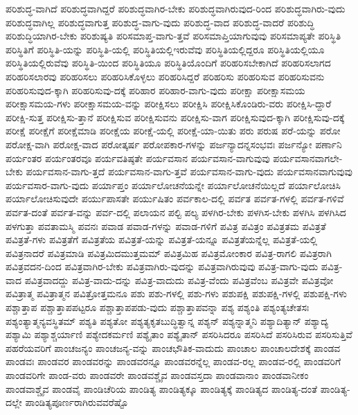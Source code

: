 {ಪರಿಶುದ್ಧ-ವಾಗಿದೆ
ಪರಿಶುದ್ಧವಾಗಿದ್ದರೆ
ಪರಿಶುದ್ಧವಾಗಿರ-ಬೇಕು
ಪರಿಶುದ್ಧವಾಗಿರುವುದ-ರಿಂದ
ಪರಿಶುದ್ಧವಾಗಿರು-ವುದು
ಪರಿಶುದ್ಧವಾಗಿಲ್ಲ
ಪರಿಶುದ್ಧವಾಗುತ್ತ
ಪರಿಶುದ್ಧ-ವಾಗು-ವುದು
ಪರಿಶುದ್ಧ-ವಾದ
ಪರಿಶುದ್ಧ-ವಾದರೆ
ಪರಿಶುದ್ಧಿ
ಪರಿಶುದ್ಧಿಯಾಗಿರ-ಬೇಕು
ಪರಿಶುಷ್ಯತಿ
ಪರಿಸಮಾಪ್ತ-ವಾಗು-ತ್ತವೆ
ಪರಿಸಮಾಪ್ತಿಯಾಗುವುವು
ಪರಿಸಮಾಪ್ಯತೇ
ಪರಿಸ್ಥಿತಿ
ಪರಿಸ್ಥಿತಿಗೆ
ಪರಿಸ್ಥಿತಿ-ಯನ್ನು
ಪರಿಸ್ಥಿತಿ-ಯಲ್ಲಿ
ಪರಿಸ್ಥಿತಿಯಲ್ಲಿಇರುವೆವು
ಪರಿಸ್ಥಿತಿಯಲ್ಲಿದ್ದರೂ
ಪರಿಸ್ಥಿತಿಯಲ್ಲಿಯೂ
ಪರಿಸ್ಥಿತಿಯಲ್ಲಿರುವೆವು
ಪರಿಸ್ಥಿತಿ-ಯಿಂದ
ಪರಿಸ್ಥಿತಿಯೂ
ಪರಿಸ್ಥಿತಿಯೊಂದಿಗೆ
ಪರಿಹರಿಸಬೇಕಾಗಿದೆ
ಪರಿಹರಿಸಲಾಗದ
ಪರಿಹರಿಸಲಾರವು
ಪರಿಹರಿಸಲು
ಪರಿಹರಿಸಿಕೊಳ್ಳಲು
ಪರಿಹರಿಸಿದ್ದರೆ
ಪರಿಹರಿಸು
ಪರಿಹರಿಸುವ
ಪರಿಹರಿಸುವನು
ಪರಿಹರಿಸುವುದ-ಕ್ಕಾಗಿ
ಪರಿಹರಿಸುವು-ದಕ್ಕೆ
ಪರಿಹಾರ
ಪರಿಹಾರ-ವಾಗು-ವುದು
ಪರೀಕ್ಷಾ
ಪರೀಕ್ಷಾಸಮಯ
ಪರೀಕ್ಷಾಸಮಯ-ಗಳು
ಪರೀಕ್ಷಾಸಮಯ-ವನ್ನು
ಪರೀಕ್ಷಿಸಲು
ಪರೀಕ್ಷಿಸಿ
ಪರೀಕ್ಷಿಸಿಕೊಂಡಿರು-ವರು
ಪರೀಕ್ಷಿಸಿ-ದ್ದಾರೆ
ಪರೀಕ್ಷಿ-ಸುತ್ತ
ಪರೀಕ್ಷಿಸು-ತ್ತಾನೆ
ಪರೀಕ್ಷಿಸುವ
ಪರೀಕ್ಷಿಸುವನು
ಪರೀಕ್ಷಿಸು-ವಾಗ
ಪರೀಕ್ಷಿಸುವುದ-ಕ್ಕಾಗಿ
ಪರೀಕ್ಷಿಸುವು-ದಕ್ಕೆ
ಪರೀಕ್ಷೆ
ಪರೀಕ್ಷೆಗೆ
ಪರೀಕ್ಷೆಮಾಡಿ
ಪರೀಕ್ಷೆಯ
ಪರೀಕ್ಷೆ-ಯಲ್ಲಿ
ಪರೀಕ್ಷೆ-ಯಾ-ಯಿತು
ಪರು
ಪರುಷ
ಪರೆ-ಯನ್ನು
ಪರೋ
ಪರೋಕ್ಷ-ವಾಗಿ
ಪರೋಕ್ಷ-ವಾದ
ಪರೋತ್ಕರ್ಷ
ಪರೋಪಕಾರ-ಗಳನ್ನು
ಪರ್ಜನ್ಯಾದನ್ನಸಂಭವಃ
ಪರ್ಜನ್ಯೋ
ಪರ್ಣಾನಿ
ಪರ್ಯಂತರ
ಪರ್ಯಂತರವೂ
ಪರ್ಯವತಿಷ್ಠತೇ
ಪರ್ಯವಸಾನ
ಪರ್ಯವಸಾನ-ವಾಗುವುವು
ಪರ್ಯವಸಾನವಾಗಲೇ-ಬೇಕು
ಪರ್ಯವಸಾನ-ವಾಗು-ತ್ತದೆ
ಪರ್ಯವಸಾನ-ವಾಗು-ತ್ತವೆ
ಪರ್ಯವಸಾನ-ವಾಗು-ವುದು
ಪರ್ಯವಸಾನವಾಗುವುವು
ಪರ್ಯವಸಾರ-ವಾಗು-ವುದು
ಪರ್ಯಾಪ್ತಂ
ಪರ್ಯಾಲೋಚನೆಯನ್ನೇ
ಪರ್ಯಾಲೋಚನೆಯಿಲ್ಲದೆ
ಪರ್ಯಾಲೋಚಿಸಿ
ಪರ್ಯಾಲೋಚಿಸುವುದೇ
ಪರ್ಯುಪಾಸತೇ
ಪರ್ಯುಷಿತಂ
ಪರ್ವಕಾಲ-ದಲ್ಲಿ
ಪರ್ವತ
ಪರ್ವತ-ಗಳಲ್ಲಿ
ಪರ್ವತ-ಗಳಿವೆ
ಪರ್ವತ-ದಂತೆ
ಪರ್ವತ-ವನ್ನು
ಪರ್ವ-ದಲ್ಲಿ
ಪಲಾಯನ
ಪಲ್ಟಿ
ಪಲ್ಯ
ಪಳಗಿರ-ಬೇಕು
ಪಳಗಿಸ-ಬೇಕು
ಪಳಗಿಸಿ
ಪಳಗಿಸಿದ
ಪಳಗುತ್ತಾ
ಪವತಾಮಸ್ಮಿ
ಪವನಃ
ಪವಾಡ
ಪವಾಡ-ಗಳನ್ನು
ಪವಾಡ-ಗಳಿಗೆ
ಪವಿತ್ರ
ಪವಿತ್ರಂ
ಪವಿತ್ರತಮ
ಪವಿತ್ರತೆ
ಪವಿತ್ರತೆ-ಗಳು
ಪವಿತ್ರತೆಗೆ
ಪವಿತ್ರತೆಯ
ಪವಿತ್ರತೆ-ಯನ್ನು
ಪವಿತ್ರತೆ-ಯನ್ನೂ
ಪವಿತ್ರತೆಯನ್ನೆಲ್ಲ
ಪವಿತ್ರತೆ-ಯಲ್ಲಿ
ಪವಿತ್ರನಾದರೆ
ಪವಿತ್ರಮಾಡಿ
ಪವಿತ್ರಮಿದಮುತ್ತಮಮ್
ಪವಿತ್ರಮಿಹ
ಪವಿತ್ರಮೋಂಕಾರ
ಪವಿತ್ರ-ರಾಗಲಿ
ಪವಿತ್ರರಾಗಿ
ಪವಿತ್ರವದನ-ದಿಂದ
ಪವಿತ್ರವಾಗಿರ-ಬೇಕು
ಪವಿತ್ರವಾಗಿರು-ವುದನ್ನು
ಪವಿತ್ರವಾಗಿರುವುವು
ಪವಿತ್ರ-ವಾಗು-ವುದು
ಪವಿತ್ರ-ವಾದ
ಪವಿತ್ರವಾದದ್ದು
ಪವಿತ್ರ-ವಾದು-ದನ್ನು
ಪವಿತ್ರ-ವಾದುದು
ಪವಿತ್ರ-ವೆಂದು
ಪವಿತ್ರವೆಂಬ
ಪವಿತ್ರವೇ
ಪವಿತ್ರವೋ
ಪವಿತ್ರಾತ್ಮ
ಪವಿತ್ರಾತ್ಮನ
ಪವಿತ್ರೋತ್ತಮನೂ
ಪಶು
ಪಶು-ಗಳಲ್ಲಿ
ಪಶು-ಗಳು
ಪಶುಪಕ್ಷಿ
ಪಶುಪಕ್ಷಿ-ಗಳಲ್ಲಿ
ಪಶುಪಕ್ಷಿ-ಗಳು
ಪಶ್ಚಾತ್ತಾಪ
ಪಶ್ಚಾತ್ತಾಪಪಟ್ಟರೂ
ಪಶ್ಚಾತ್ತಾಪಪಡು-ವುದು
ಪಶ್ಚಾತ್ತಾಪವನ್ನಾ
ಪಶ್ಯ
ಪಶ್ಯಂತಿ
ಪಶ್ಯಂತ್ಯಚೇತಸಃ
ಪಶ್ಯಂತ್ಯಾತ್ಮನ್ಯವಸ್ಥಿತಮ್
ಪಶ್ಯತಿ
ಪಶ್ಯತೋ
ಪಶ್ಯತ್ಯಕೃತಬುದ್ಧಿತ್ವಾನ್ನ
ಪಶ್ಯನ್
ಪಶ್ಯನ್ನಾತ್ಮನಿ
ಪಶ್ಯಾದಿತ್ಯಾನ್
ಪಶ್ಯಾದ್ಯ
ಪಶ್ಯಾಮಿ
ಪಶ್ಯಾಶ್ಚರ್ಯಾಣಿ
ಪಶ್ಯೇದಕರ್ಮಣಿ
ಪಶ್ಯೈತಾಂ
ಪಶ್ಯೈತಾನ್
ಪಸರಿಸಿದರೂ
ಪಸರಿಸಿದೆ
ಪಸರಿಸಿರುವ
ಪಸರಿಸುತ್ತಿವೆ
ಪಹರೆಯವರಿಗೆ
ಪಾಂಚಜನ್ಯಂ
ಪಾಂಚಜನ್ಯ-ವನ್ನು
ಪಾಂಚಭೌತಿಕ-ವಾದುದು
ಪಾಂಚಾಲ
ಪಾಂಚಾಲದೇಶಕ್ಕೆ
ಪಾಂಡವ
ಪಾಂಡವಃ
ಪಾಂಡವರ
ಪಾಂಡವರನ್ನು
ಪಾಂಡವರನ್ನೂ
ಪಾಂಡವರನ್ನೆಲ್ಲ
ಪಾಂಡವ-ರಲ್ಲ
ಪಾಂಡವ-ರಲ್ಲಿ
ಪಾಂಡವರಿಗೆ
ಪಾಂಡವರಿಗೇ
ಪಾಂಡ-ವರು
ಪಾಂಡವರೇ
ಪಾಂಡವಶ್ಚೈವ
ಪಾಂಡವಸ್ತದಾ
ಪಾಂಡವಾನಾಂ
ಪಾಂಡವಾನೀಕಂ
ಪಾಂಡವಾಶ್ಚೈವ
ಪಾಂಡವೈ
ಪಾಂಡಿಚೆರಿಯ
ಪಾಂಡಿತ್ಯ
ಪಾಂಡಿತ್ಯಕ್ಕೂ
ಪಾಂಡಿತ್ಯಕ್ಕೆ
ಪಾಂಡಿತ್ಯದ
ಪಾಂಡಿತ್ಯ-ದಂತೆ
ಪಾಂಡಿತ್ಯ-ದಲ್ಲೇ
ಪಾಂಡಿತ್ಯಪೂರ್ಣರಾಗಿರುವವರೆಷ್ಟೊ
}
